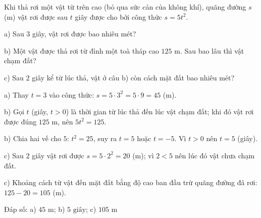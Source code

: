 \begin{problem}[9DS-HSB2-013]
Khi thả rơi một vật từ trên cao (bỏ qua sức cản của không khí), quãng đường $s$ (m) vật rơi được sau $t$ giây được cho bởi công thức $s = 5t^2$.

a) Sau $3$ giây, vật rơi được bao nhiêu mét?

b) Một vật được thả rơi từ đỉnh một toà tháp cao $125$ m. Sau bao lâu thì vật chạm đất?

c) Sau $2$ giây kể từ lúc thả, vật ở câu b) còn cách mặt đất bao nhiêu mét?

\begin{solution}
a) Thay $t = 3$ vào công thức: $s = 5 \cdot 3^2 = 5 \cdot 9 = 45$ (m).

b) Gọi $t$ (giây, $t > 0$) là thời gian từ lúc thả đến lúc vật chạm đất; khi đó vật rơi được đúng $125$ m, nên $5t^2 = 125$.

b) Chia hai vế cho $5$: $t^2 = 25$, suy ra $t = 5$ hoặc $t = -5$. Vì $t > 0$ nên $t = 5$ (giây).

c) Sau $2$ giây vật rơi được $s = 5 \cdot 2^2 = 20$ (m); vì $2 < 5$ nên lúc đó vật chưa chạm đất.

c) Khoảng cách từ vật đến mặt đất bằng độ cao ban đầu trừ quãng đường đã rơi: $125 - 20 = 105$ (m).

Đáp số: a) $\boxed{45 \text{ m}}$; b) $\boxed{5 \text{ giây}}$; c) $\boxed{105 \text{ m}}$
\end{solution}
\end{problem}

